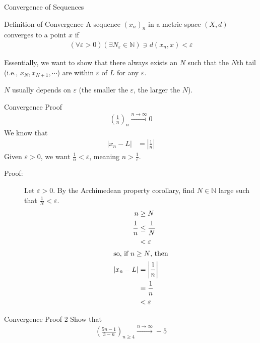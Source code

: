 \documentclass[8pt]{extarticle}
\newcommand{\N}{\mathbb{N}}
\begin{document}
\begin{problem}{Convergence of Sequences}
\begin{problem}{Definition of Convergence}
      A sequence $(x_n)_n$ in a metric space $(X,d)$ converges to a point $x$ if
      \begin{align*}
        \left(\forall \varepsilon > 0\right)\left(\exists N_{\varepsilon}\in\N\right) \ni d(x_n,x) < \varepsilon
      \end{align*}
    \end{problem}
    Essentially, we want to show that there always exists an $N$ such that the $N$th tail (i.e., $x_{N}, x_{N+1},\cdots$) are within $\varepsilon$ of $L$ for any $\varepsilon$.
    \begin{description}
      \small
      \item[Note:] $N$ usually depends on $\varepsilon$ (the smaller the $\varepsilon$, the larger the $N$).
    \end{description}
    \begin{problem}{Convergence Proof}
      \begin{align*}
        \left(\frac{1}{n}\right)_{n} \xrightarrow{n\rightarrow\infty} 0
      \end{align*}
      \tcblower
      We know that
      \begin{align*}
        |x_n - L| &= \left|\frac{1}{n}\right|
      \end{align*}
      Given $\varepsilon > 0$, we want $\frac{1}{n} < \varepsilon$, meaning $n > \frac{1}{\varepsilon}$.
      \begin{description}
        \item[Proof:] Let $\varepsilon > 0$. By the Archimedean property corollary, find $N\in\N$ large such that $\frac{1}{N} < \varepsilon$.
          \begin{align*}
            n &\geq N\\
            \frac{1}{n} &\leq \frac{1}{N}\\
                        &< \varepsilon\\
            \shortintertext{so, if $n\geq N$, then}
            |x_n - L| &= \left|\frac{1}{n}\right|\\
                      &= \frac{1}{n}\\
                      &< \varepsilon
          \end{align*}
      \end{description}
    \end{problem}
    \begin{problem}{Convergence Proof 2}
      Show that
      \begin{align*}
        \left(\frac{5n-1}{3-n}\right)_{n\geq 4} \xrightarrow{n\rightarrow\infty} -5

\end{align*}
\end{problem}
\end{problem}
\end{document}
